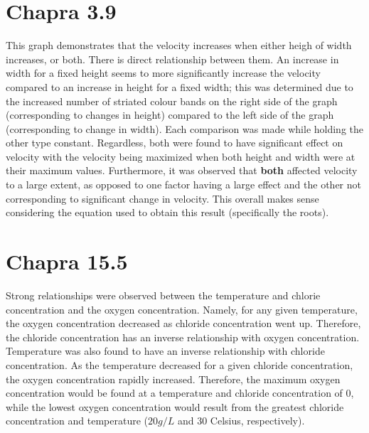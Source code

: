 \documentclass{article}
\begin{document}
\section{Chapra 3.9}
This graph demonstrates that the velocity increases when either heigh of width increases, or both. There is direct relationship between them. An increase in width for a fixed height seems to more significantly increase the velocity compared to an increase in height for a fixed width; this was determined due to the increased number of striated colour bands on the right side of the graph (corresponding to changes in height) compared to the left side of the graph (corresponding to change in width). Each comparison was made while holding the other type constant. Regardless, both were found to have significant effect on velocity with the velocity being maximized when both height and width were at their maximum values. Furthermore, it was observed that \textbf{both} affected velocity to a large extent, as opposed to one factor having a large effect and the other not corresponding to significant change in velocity. This overall makes sense considering the equation used to obtain this result (specifically the roots).

\section{Chapra 15.5}
Strong relationships were observed between the temperature and chlorie concentration and the oxygen concentration. Namely, for any given temperature, the oxygen concentration decreased as chloride concentration went up. Therefore, the chloride concentration has an inverse relationship with oxygen concentration. Temperature was also found to have an inverse relationship with chloride concentration. As the temperature decreased for a given chloride concentration, the oxygen concentration rapidly increased. Therefore, the maximum oxygen concentration would be found at a temperature and chloride concentration of 0, while the lowest oxygen concentration would result from the greatest chloride concentration and temperature ($20 g/L$ and $30$ Celsius, respectively). 
\end{document}
